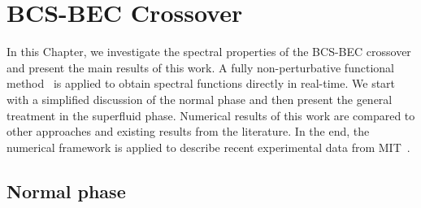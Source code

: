 \chapter{BCS-BEC Crossover}
\label{chapter:bcs-bec-crossover}

In this Chapter, we investigate the spectral properties of the BCS-BEC crossover and present the main results of this work. A fully non-perturbative functional method~\cite{Horak2020} is applied to obtain spectral functions directly in real-time. We start with a simplified discussion of the normal phase and then present the general treatment in the superfluid phase. Numerical results of this work are compared to other approaches and existing results from the literature. In the end, the numerical framework is applied to describe recent experimental data from MIT~\cite{Mukherjee2019}.


\section{Normal phase}
\label{section:normal-phase}

